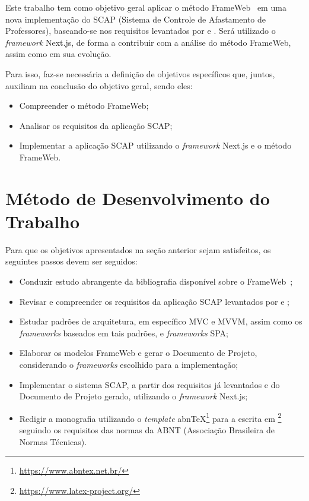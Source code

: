 Este trabalho tem como objetivo geral aplicar o método FrameWeb~\cite{souza:2007} em uma nova implementação do SCAP (Sistema de Controle de Afastamento de Professores),
baseando-se nos requisitos levantados por  e . Será utilizado o \textit{framework} Next.js, de forma a contribuir com a análise do método FrameWeb, assim como em sua evolução.

Para isso, faz-se necessária a definição de objetivos específicos que, juntos, auxiliam na conclusão do objetivo geral, sendo eles:
\begin{itemize}
    \item Compreender o método FrameWeb;
    \item Analisar os requisitos da aplicação SCAP;
    \item Implementar a aplicação SCAP utilizando o \textit{framework} Next.js e o método FrameWeb.
\end{itemize}


\section{Método de Desenvolvimento do Trabalho}
\label{sec-intro-met}

Para que os objetivos apresentados na seção anterior sejam satisfeitos, os seguintes passos devem ser seguidos:

\begin{itemize}
    \item Conduzir estudo abrangente da bibliografia disponível sobre o FrameWeb~\cite{souza:2007,souza:2020};
    \item Revisar e compreender os requisitos da aplicação SCAP levantados por  e ;
    \item Estudar padrões de arquitetura, em específico MVC e MVVM, assim como os \textit{frameworks} baseados em tais padrões, e \textit{frameworks} SPA;
    \item Elaborar os modelos FrameWeb e gerar o Documento de Projeto, considerando o \textit{frameworks} escolhido para a implementação;
    \item Implementar o sistema SCAP, a partir dos requisitos já levantados e do Documento de Projeto gerado, utilizando o \textit{framework} Next.js;
    \item Redigir a monografia utilizando o \textit{template} abnTeX\footnote{\url{https://www.abntex.net.br/}} para a escrita em \latex\footnote{\url{https://www.latex-project.org/}} seguindo os requisitos das normas da ABNT (Associação Brasileira de Normas Técnicas).
\end{itemize}


